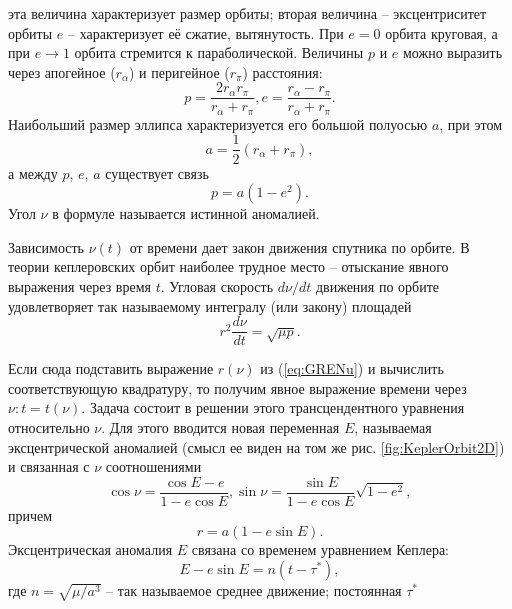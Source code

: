 эта величина характеризует размер орбиты; вторая величина -- эксцентриситет орбиты $e$ --
характеризует её сжатие, вытянутость. При $e = 0$ орбита круговая, а при $e \rightarrow 1$
орбита стремится к параболической. Величины $p$ и $e$ можно выразить через апогейное
($r_{\alpha}$) и перигейное ($r_{\pi}$) расстояния:
\begin{equation}
  p = \frac{2r_{\alpha}r_{\pi}}{r_{\alpha} + r_{\pi}},
  e = \frac{r_{\alpha} - r_{\pi}}{r_{\alpha} + r_{\pi}}.
\end{equation}
Наибольший размер эллипса характеризуется его большой полуосью $a$, при этом
\begin{equation}
  a = \frac{1}{2}(r_{\alpha} + r_{\pi}),
\end{equation}
а между $p$, $e$, $a$ существует связь
\begin{equation}
  p = a(1 - e^2).
\end{equation}
Угол $\nu$ в формуле \label{eq:GRENu} называется истинной аномалией.\par
Зависимость $\nu(t)$ от времени дает закон движения спутника по орбите. В теории
кеплеровских орбит наиболее трудное место -- отыскание явного выражения через время
$t$. Угловая скорость $d\nu/dt$ движения по орбите удовлетворяет так называемому
интегралу (или закону) площадей
\begin{equation} \label{eq:GIntegralSquares}
  r^2\frac{d\nu}{dt} = \sqrt{\mu p}.
\end{equation}\par
Если сюда подставить выражение $r(\nu)$ из (\ref{eq:GRENu}) и вычислить соответствующую
квадратуру, то получим явное выражение времени через $\nu: t = t(\nu)$. Задача состоит
в решении этого трансцендентного уравнения относительно $\nu$. Для этого вводится
новая переменная $E$, называемая эксцентрической аномалией (смысл ее виден на том
же рис. \ref{fig:KeplerOrbit2D}) и связанная с $\nu$ соотношениями
\begin{equation}
  \cos\nu = \frac{\cos E - e}{1 - e\cos E}, \sin\nu = \frac{\sin E}{1 - e\cos E}\sqrt{1 - e^2},
\end{equation}
причем
\begin{equation}
  r = a(1 - e\sin E).
\end{equation}
Эксцентрическая аномалия $E$ связана со временем уравнением Кеплера:
\begin{equation} \label{eq:EscentricAnomaly}
  E - e\sin E = n(t-\tau^*),
\end{equation}
где $n = \sqrt{\mu/a^3}$ -- так называемое среднее движение; постоянная $\tau^*$
